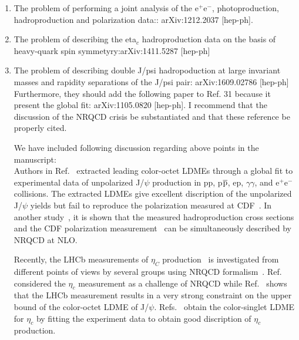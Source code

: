 \documentclass[aps,prc,preprint,superscriptaddress,showpacs,showkeys,amsmath]{revtex4-1}
\begin{document}
\begin{enumerate}

\item The problem of performing a joint analysis of the e$^{+}$e$^{-}$, photoproduction, hadroproduction and polarization 
  data:: arXiv:1212.2037 [hep-ph].

\item The problem of describing the eta$_c$ hadroproduction data on the basis of heavy-quark spin symmetyry:arXiv:1411.5287 [hep-ph]

\item The problem of describing double J/psi hadropoduction at large invariant masses and rapidity 
  separations of the J/psi pair: arXiv:1609.02786 [hep-ph]
  Furthermore, they should add the following paper to Ref. 31 because it present the global fit: arXiv:1105.0820 [hep-ph].
  I recommend that the discussion of the NRQCD crisis be substantiated and that these reference be properly cited. 



{\color{blue}

  We have included following discussion regarding above points in the manuscript:\\ 
  
  Authors in Ref.~\cite{Butenschoen:2012qr} extracted leading color-octet LDMEs
  through a global fit to experimental data of unpolarized J/$\psi$ production in pp, p$\overline{\rm p}$, ep, $\gamma \gamma$, 
  and e$^{+}$e$^{-}$ collisions. The extracted LDMEs give excellent discription of the 
  unpolarized J/$\psi$ yields but fail to reproduce the  polarization measured at CDF~\cite{Abulencia:2007us}.
  In another study~\cite{Chao:2012iv}, it is shown that the measured hadroproduction cross sections 
  and the CDF polarization measurement~\cite{Abulencia:2007us} can be simultaneously described by NRQCD at NLO.
  
   Recently, the LHCb measurements of $\eta_{C}$ production~\cite{Aaij:2014bga} 
   is investigated from different points of views by several groups using  
   NRQCD formalism~\cite{Butenschoen:2014dra,Han:2014jya,Zhang:2014ybe}.   
   Ref.~\cite{Butenschoen:2014dra} considered the $\eta_{ c}$ measurement as a challenge of NRQCD 
   while Ref.~\cite{Han:2014jya} shows that the LHCb measurement results in a very 
   strong constraint on the upper bound of the color-octet LDME of J/$\psi$.
   Refs.~\cite{Zhang:2014ybe} obtain the color-singlet LDME for 
   $\eta_c$ by fitting the experiment data to obtain good discription of $\eta_c$ production.
   

}
\end{enumerate}
\end{document}

